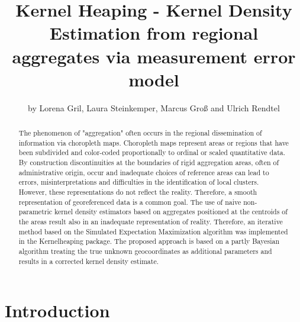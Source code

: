 \title{Kernel Heaping - Kernel Density Estimation from regional aggregates via
measurement error model}
\author{by Lorena Gril, Laura Steinkemper, Marcus Groß and Ulrich Rendtel}

\maketitle

\begin{abstract}
The phenomenon of "aggregation" often occurs in the regional dissemination of information via choropleth maps. 
Choropleth maps represent areas or regions that have been subdivided and color-coded proportionally to ordinal or scaled quantitative data.
By construction discontinuities at the boundaries of rigid aggregation areas, often of administrative origin, occur and inadequate choices of reference areas can lead to errors, misinterpretations and difficulties in the identification of local clusters. 
However, these representations do not reflect the reality. Therefore, a smooth representation of georeferenced data is a common goal. 
The use of naive non-parametric kernel density estimators based on aggregates positioned at the centroids of the areas result also in an inadequate representation of reality. Therefore, an iterative method based on the Simulated Expectation Maximization algorithm was implemented in the Kernelheaping package. The proposed approach is based on a partly Bayesian algorithm treating the true unknown geocoordinates as additional parameters and results in a  corrected kernel density estimate.
\end{abstract}


\section{Introduction}

